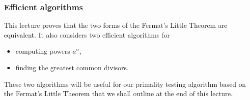 

\begin{frame}\frametitle{Efficient algorithms}
  This lecture proves that the two forms of the Fermat's Little
  Theorem are equivalent.  It also considers two efficient algorithms
  for
  \begin{itemize}
  \item computing powers $a^n$,
  \item finding the greatest common divisors.
  \end{itemize}
  These two algorithms will be useful for our primality testing
  algorithm based on the Fermat's Little Theorem that we shall outline
  at the end of this lecture.
\end{frame}
